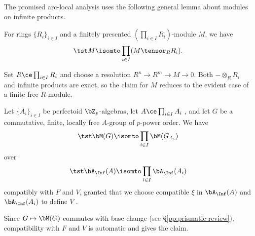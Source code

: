 The promised arc-local analysis uses the following
general lemma about modules on infinite products.


\blem \label{product-lemma}
For rings $\{R_i\}_{i \in I}$ and a finitely presented $(\prod_{i \in I} R_i)$-module $M$, we have %
\begin{equation*}
\tst M \isomto \prod_{i \in I} (M \tensor_R R_i).
\end{equation*}
\elem

\bpf
Set $R\ce \prod_{i\in I} R_i$ and choose a resolution $R^n\to R^m\to M\to 0$. Both $-\otimes_R R_i$ and
infinite products are exact, so the claim for $M$ reduces to the evident case of a finite %
free $R$-module. %
\epf






\bprop \label{M(G)-products}
Let $\{A_i \}_{i \in I}$ be perfectoid $\bZ_p$-algebras, let $A \ce \prod_{i \in I} A_i$ , and let $G$ be a commutative, finite, locally free $A$-group of $p$-power order. We have
\[
\tst \bM(G) \isomto \prod_{i \in I} \bM(G_{A_i})
\]
over
\[
\tst \bA_\Inf(A) \isomto \prod_{i \in I} \bA_\Inf(A_i)
\]
compatibly with $F$ and $V$, granted that we choose compatible $\xi$ in $\bA_\Inf(A)$ and $\bA_\Inf(A_i)$ to define $V$ .
\eprop

\bpf
Since $G \mapsto \bM(G)$ commutes with base change (see \S\ref{pp:prismatic-review}), compatibility with $F$ and $V$ is automatic and  gives the claim.
\epf






